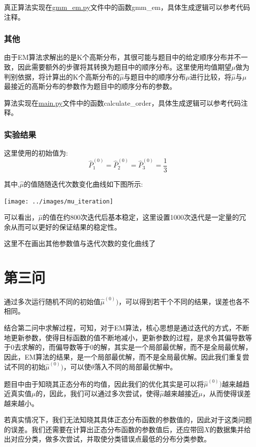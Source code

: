 \documentclass[UTF8]{article} %
\begin{document}
    真正算法实现在\href{run:gmm_em.py}{gmm\_em.py}文件中的函数gmm\_em，具体生成逻辑可以参考代码注释。

    \subsubsection{其他}
    由于EM算法求解出的是K个高斯分布，其很可能与题目中的给定顺序分布并不一致，因此需要额外的步骤将其转换为题目中的顺序分布。这里使用均值期望$\mu$做为判别依据，将计算出的K个高斯分布的$\hat{\mu}$与题目中的顺序分布$\mu$进行比较，将$\hat{\mu}$与$\mu$最接近的高斯分布的参数作为题目中的顺序分布的参数。

    算法实现在\href{run:main.py}{main.py}文件中的函数calculate\_order，具体生成逻辑可以参考代码注释。

    \subsubsection{实验结果}
    这里使用的初始值为:
    \[
        \hat{P}_1^{(0)} = \hat{P}_2^{(0)} = \hat{P}_3^{(0)} = \frac{1}{3}
    \]
    

    其中,$\hat{\mu}$的值随随迭代次数变化曲线如下图所示:

    \texttt{[image: ../images/mu\_iteration]}

    可以看出，$\hat{\mu}$的值在约800次迭代后基本稳定，这里设置1000次迭代是一定量的冗余从而可以更好的保证结果的稳定性。

    这里不在画出其他参数值与迭代次数的变化曲线了


    \section{第三问}
    通过多次运行随机不同的初始值$\hat{\mu}^{(0)})$，可以得到若干个不同的结果，误差也各不相同。

    结合第二问中求解过程，可知，对于EM算法，核心思想是通过迭代的方式，不断地更新参数，使得目标函数的值不断地减小，更新参数的过程，是求令其偏导数等于0去求解的，而偏导数等于0的解，其实是一个局部最优解，而不是全局最优解，因此，EM算法的结果，是一个局部最优解，而不是全局最优解。因此我们重复尝试不同的初始$\hat{\mu}^{(0)})$，可以使$\theta$落入不同的局部最优解中。

    题目中由于知晓其正态分布的均值，因此我们的优化其实是可以将$\hat{\mu}^{(0)})$越来越趋近真实值$\mu$的，因此，我们可以通过多次尝试，使得$\hat{\mu}$越来越接近$\mu$，从而使得误差越来越小。

    若真实情况下，我们无法知晓其具体正态分布函数的参数值的，因此对于这类问题的误差。我们还需要在计算出正态分布函数的参数值后，还应带回$X$的数据集并给出对应分类，做多次尝试，并取使分类错误点最低的分布分类参数。
\end{document}
